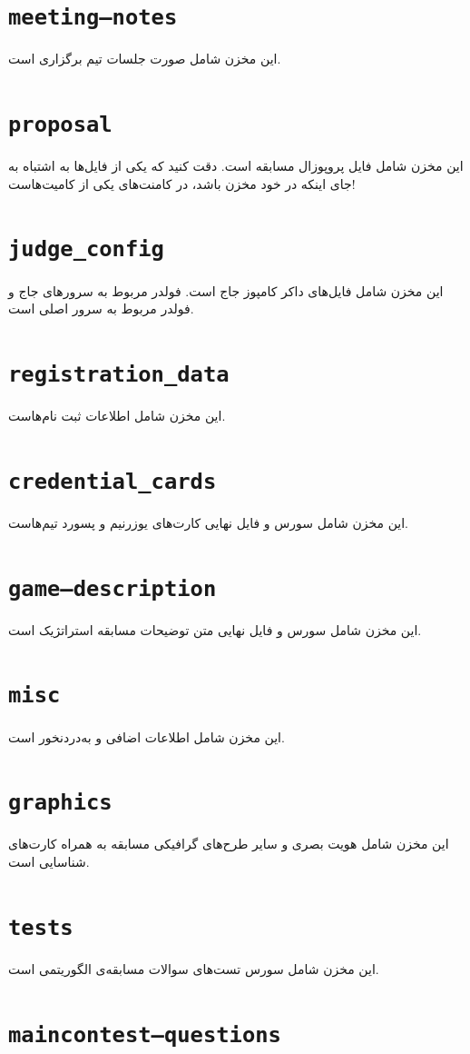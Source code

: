 \documentclass{report}
\begin{document}
\cprotect\section{\verb|meeting‌‌—notes|}
این مخزن شامل صورت جلسات تیم برگزاری است.
\cprotect\section{\verb|proposal|}
این مخزن شامل فایل پروپوزال مسابقه است. دقت کنید که یکی از فایل‌ها به اشتباه به جای اینکه در خود مخزن باشد، در کامنت‌های یکی از کامیت‌هاست!
\cprotect\section{\verb|judge_config|}
این مخزن شامل فایل‌های داکر کامپوز جاج است. فولدر  مربوط به سرورهای جاج و فولدر  مربوط به سرور اصلی است.
\cprotect\section{\verb|registration_data|}
این مخزن شامل اطلاعات ثبت نام‌هاست.
\cprotect\section{\verb|credential_cards|}
این مخزن شامل سورس و فایل نهایی کارت‌های یوزرنیم و پسورد تیم‌هاست.
\cprotect\section{\verb|game—description|}
این مخزن شامل سورس و فایل نهایی متن توضیحات مسابقه استراتژیک است.
\cprotect\section{\verb|misc|}
این مخزن شامل اطلاعات اضافی و به‌درد‌نخور است.
\cprotect\section{\verb|graphics|}
این مخزن شامل هویت بصری و سایر طرح‌های گرافیکی مسابقه به همراه کارت‌های شناسایی است.
\cprotect\section{\verb|tests|}
این مخزن شامل سورس تست‌های سوالات مسابقه‌ی الگوریتمی است.
\cprotect\section{\verb|maincontest—questions|}
\end{document}
